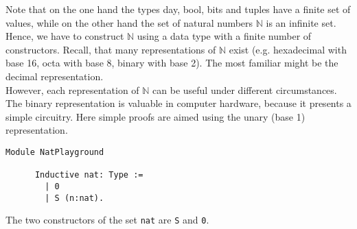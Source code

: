 	  Note that on the one hand the types day, bool, bits and tuples have a finite set of values, while on the other hand the set of natural numbers $\mathbb{N}$ is an infinite set.\\ 
	  Hence, we have to construct $\mathbb{N}$ using a data type with a finite number of constructors. 
	  Recall, that many representations of $\mathbb{N}$ exist (e.g. hexadecimal with base 16, octa with base 8, binary with base 2).
	  The most familiar might be the decimal representation.\\
	  However, each representation of $\mathbb{N}$ can be useful under different circumstances. 
	  The binary representation is valuable in computer hardware, because it presents a simple circuitry.
	  Here simple proofs are aimed using the unary (base 1) representation.
	  
	  \begin{lstlisting}[caption={\lstinline!nat!}, label=lst:DefNat]
	  Module NatPlayground
	  
	  Inductive nat: Type :=
	    | 0
	    | S (n:nat).
	  \end{lstlisting}  
	  The two constructors of the set \lstinline!nat! are \lstinline!S! and \lstinline!0!. \\
	
